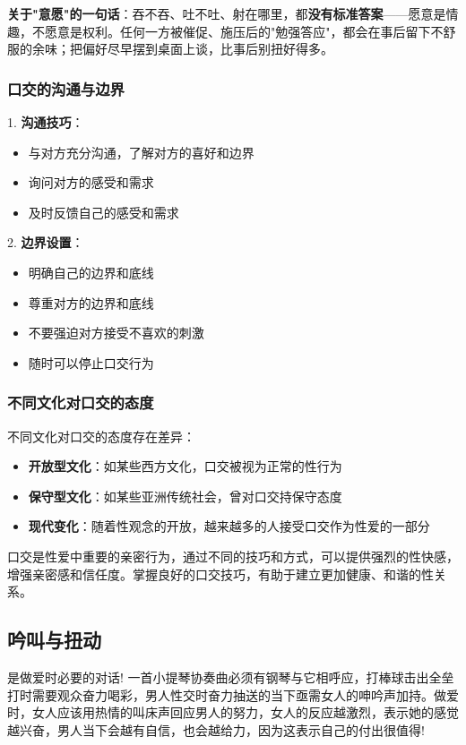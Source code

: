 \documentclass[12pt,UTF8]{ctexbook}
\begin{document}
\vspace{0.5em}
\noindent\textbf{关于"意愿"的一句话}：吞不吞、吐不吐、射在哪里，都\textbf{没有标准答案}——愿意是情趣，不愿意是权利。任何一方被催促、施压后的"勉强答应"，都会在事后留下不舒服的余味；把偏好尽早摆到桌面上谈，比事后别扭好得多。

\subsubsection{口交的沟通与边界}

1. \textbf{沟通技巧}：
  \begin{itemize}
  \item 与对方充分沟通，了解对方的喜好和边界
  \item 询问对方的感受和需求
  \item 及时反馈自己的感受和需求
  \end{itemize}

2. \textbf{边界设置}：
  \begin{itemize}
  \item 明确自己的边界和底线
  \item 尊重对方的边界和底线
  \item 不要强迫对方接受不喜欢的刺激
  \item 随时可以停止口交行为
  \end{itemize}

\subsubsection{不同文化对口交的态度}

不同文化对口交的态度存在差异：

\begin{itemize}
\item \textbf{开放型文化}：如某些西方文化，口交被视为正常的性行为
\item \textbf{保守型文化}：如某些亚洲传统社会，曾对口交持保守态度
\item \textbf{现代变化}：随着性观念的开放，越来越多的人接受口交作为性爱的一部分
\end{itemize}

口交是性爱中重要的亲密行为，通过不同的技巧和方式，可以提供强烈的性快感，增强亲密感和信任度。掌握良好的口交技巧，有助于建立更加健康、和谐的性关系。

\subsection{吟叫与扭动}
是做爱时必要的对话!
一首小提琴协奏曲必须有钢琴与它相呼应，打棒球击出全垒打时需要观众奋力喝彩，男人性交时奋力抽送的当下亟需女人的呻吟声加持。做爱时，女人应该用热情的叫床声回应男人的努力，女人的反应越激烈，表示她的感觉越兴奋，男人当下会越有自信，也会越给力，因为这表示自己的付出很值得!
\end{document}
